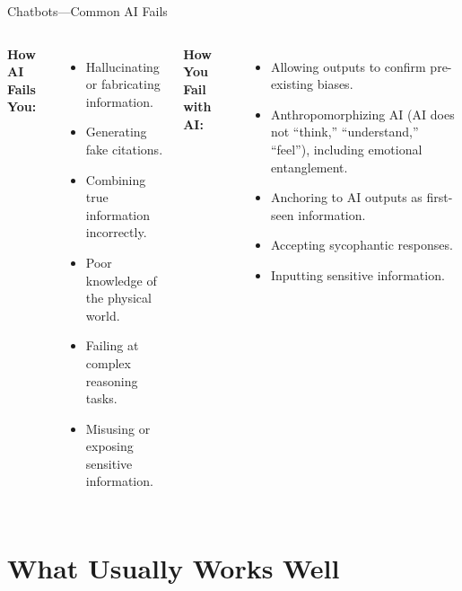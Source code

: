 \documentclass[aspectratio=169]{beamer}
\begin{document}
\begin{frame}[t]{Chatbots—Common AI Fails\\
\small{\parencite{TowardsaStandardforI537, ArtificialIntelligen058}}}
\begin{columns}[T]
    \textbf{How AI Fails You:}
    \vspace{0.8em}
    \begin{itemize}
        \item Hallucinating or fabricating information.
        \item Generating fake citations.
        \item Combining true information incorrectly.
        \item Poor knowledge of the physical world.
        \item Failing at complex reasoning tasks.
        \item Misusing or exposing sensitive information.
    \end{itemize}

    \textbf{How You Fail with AI:}
    \vspace{0.8em}
    \begin{itemize}
        \item Allowing outputs to confirm pre-existing biases.
        \item Anthropomorphizing AI (AI does not ``think,'' ``understand,'' ``feel''), including emotional entanglement.
        \item Anchoring to AI outputs as first-seen information.
        \item Accepting sycophantic responses.
        \item Inputting sensitive information.
    \end{itemize}
\end{columns}
\end{frame}

\section{What Usually Works Well}
\end{document}

